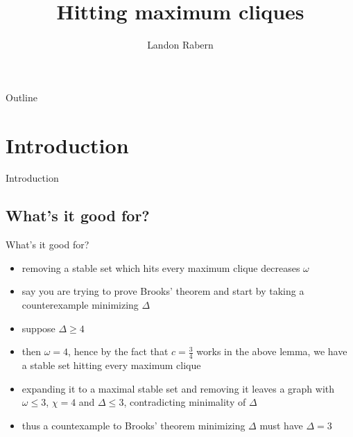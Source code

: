 \documentclass{beamer}
\title[Hitting maximum cliques]{Hitting maximum cliques}
\author{Landon Rabern}
\institute{landon.rabern@gmail.com}
\theoremstyle{plain}
\newtheorem{lem}[thm]{Lemma}
\theoremstyle{definition}
\theoremstyle{remark}
\newtheorem*{observation}{Observation}
\newcommand{\1}{\item<1-> }
\newcommand{\2}{\item<2-> }
\newcommand{\3}{\item<3-> }
\newcommand{\4}{\item<4-> }
\newcommand{\5}{\item<5-> }
\newcommand{\6}{\item<6-> }
\newcommand{\7}{\item<7-> }
\newcommand{\8}{\item<8-> }
\newcommand{\9}{\item<9-> }
\begin{document}
\begin{frame}
\titlepage
\end{frame}

\begin{frame}{Outline}
  \tableofcontents
\end{frame}
\section{Introduction}
\begin{frame}{Introduction}

\end{frame}
\begin{frame}
\end{frame}

\subsection{What's it good for?}
\begin{frame}{What's it good for?}
\begin{itemize}
\1 removing a stable set which hits every maximum clique decreases $\omega$
\2 say you are trying to prove Brooks' theorem and start by taking a counterexample minimizing $\Delta$
\3 suppose $\Delta \geq 4$
\4 then $\omega = 4$, hence by the fact that $c = \frac34$ works in the above lemma, we have a stable set hitting every maximum clique
\5 expanding it to a maximal stable set and removing it leaves a graph with $\omega \leq 3$, $\chi = 4$ and $\Delta \leq 3$, contradicting minimality of $\Delta$
\6 thus a countexample to Brooks' theorem minimizing $\Delta$ must have $\Delta = 3$
\end{itemize}
\end{frame}
\end{document}
